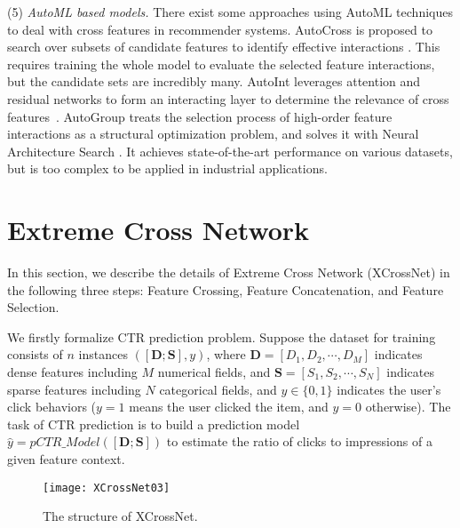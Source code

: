 \documentclass[letterpaper]{article} \usepackage{aaai21}  \usepackage{times}  \usepackage{helvet} \usepackage{courier}  \usepackage[hyphens]{url}  \usepackage{graphicx} \urlstyle{rm} \def\UrlFont{\rm}  \usepackage{natbib}  \usepackage{caption} \frenchspacing  \setlength{\pdfpagewidth}{8.5in}  \setlength{\pdfpageheight}{11in}  \usepackage{graphicx}
\begin{document}
(5) {\em AutoML based models.} There exist some approaches using AutoML techniques to deal with cross features in recommender systems. AutoCross is proposed to search over subsets of candidate features to identify effective interactions . This requires training the whole model to evaluate the selected feature interactions, but the candidate sets are incredibly many. AutoInt leverages attention and residual networks to form an interacting layer to determine the relevance of cross features~. AutoGroup treats the selection process of high-order feature interactions as a structural optimization problem, and solves it with Neural Architecture Search . It achieves state-of-the-art performance on various datasets, but is too complex to be applied in industrial applications.




\vspace{-0.2cm}
\section{Extreme Cross Network}
\vspace{-0.1cm}
In this section, we describe the details of Extreme Cross Network (XCrossNet) in the following three steps: Feature Crossing, Feature Concatenation, and Feature Selection. 

We firstly formalize CTR prediction problem.
 Suppose the dataset for training consists of $n$ instances $([\bm{D}; \bm{S}], y)$, where $\bm{D} = [D_1, D_2, \cdots, D_M]$ indicates dense features including $M$ numerical fields, and $\bm{S} = [S_1, S_2, \cdots, S_N]$ indicates sparse features including $N$ categorical fields, and $y \in \{0, 1\}$ indicates the user's click behaviors ($y=1$ means the user clicked the item, and $y=0$ otherwise). The task of CTR prediction is to build a prediction model $\hat{y}=pCTR\_Model([\bm{D}; \bm{S}])$ to estimate the ratio of clicks to impressions of a given feature context.






\begin{figure*}[!t]
	\centering
	\texttt{[image: XCrossNet03]} \caption{The structure of XCrossNet.}
	\label{fig2}
	\vspace{-0.4cm}
\end{figure*}


\vspace{-0.2cm}
\end{document}
